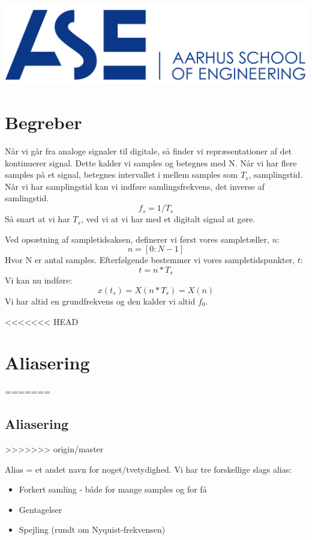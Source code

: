 \documentclass[12pt, letterpaper]{article}
\begin{document}
\begin{titlepage}
\includegraphics[scale=0.5]{billeder/au}\\ %
 

\vfill %


\end{titlepage}

\tableofcontents
\newpage

\section{Begreber}

Når vi går fra analoge signaler til digitale, så finder vi repræsentationer af det kontinuerer signal. Dette kalder vi samples og betegnes med N.
Når vi har flere samples på et signal, betegnes intervallet i mellem samples som $T_s$, samplingstid. Når vi har samplingstid kan vi indføre samlingsfrekvens, det inverse af samlingstid. $$f_s = 1/T_s$$
Så snart at vi har $T_s$, ved vi at vi har med et digitalt signal at gøre.


Ved opsætning af sampletidsaksen, definerer vi først vores sampletæller, $n$:
$$n = [0:N-1]$$ Hvor N er antal samples.
Efterfølgende bestemmer vi vores sampletidspunkter, $t$:
$$t = n*T_s$$
Vi kan nu indføre:
$$x(t_s) = X(n*T_s) = X(n)$$
Vi har altid en grundfrekvens og den kalder vi altid $f_0$.

<<<<<<< HEAD

\section{Aliasering}
=======
\subsection{Aliasering}
>>>>>>> origin/master

Alias = et andet navn for noget/tvetydighed.
Vi har tre forskellige slags alias:
\begin{itemize}
\item Forkert samling - både for mange samples og for få
\item Gentagelser
\item Spejling (rundt om Nyquist-frekvensen)
\end{itemize}
\end{document}

